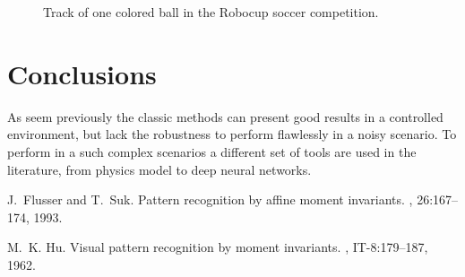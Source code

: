 \documentclass{sciposter}
\begin{document}
\begin{multicols}{3}
\begin{figure}[!h]
	\centering
			\setlength{\fboxsep}{1pt}
			\setlength{\fboxrule}{1pt}
	\caption{Track of one colored ball in the Robocup soccer competition.}
	\label{fig:robocup_1}
\end{figure}

\section{Conclusions}

As seem previously the classic methods can present good results in a controlled environment, but lack the robustness to perform flawlessly in a noisy scenario. To perform in a such complex scenarios a different set of tools are used in the literature, from physics model to deep neural networks.




\begin{thebibliography}{1}

J.~Flusser and T.~Suk.
\newblock Pattern recognition by affine moment invariants.
, 26:167--174, 1993.

M.~K. Hu.
\newblock Visual pattern recognition by moment invariants.
, IT-8:179--187, 1962.


\end{thebibliography}
\end{multicols}
\end{document}

